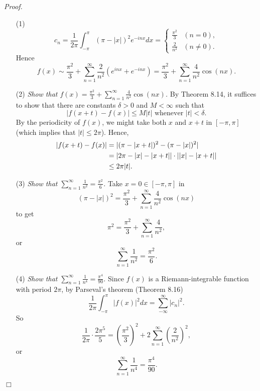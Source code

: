 \documentclass{article}
\begin{document}
\emph{Proof.}
\begin{enumerate}
\item[(1)]
\begin{equation*}
  c_n = \frac{1}{2 \pi} \int_{-\pi}^{\pi} (\pi - |x|)^2 e^{-inx} dx =
    \begin{cases}
      \frac{\pi^2}{3} & (n = 0), \\
      \frac{2}{n^2} & (n \neq 0).
    \end{cases}
\end{equation*}
Hence
\[
  f(x)
  \sim
  \frac{\pi^2}{3} + \sum_{n=1}^{\infty} \frac{2}{n^2}(e^{inx} + e^{-inx})
  =
  \frac{\pi^2}{3} + \sum_{n=1}^{\infty} \frac{4}{n^2} \cos(nx).
\]

\item[(2)]
\emph{Show that $f(x) = \frac{\pi^2}{3} + \sum_{n=1}^{\infty} \frac{4}{n^2} \cos(nx)$.}
By Theorem 8.14,
it suffices to show that there are constants $\delta > 0$ and $M < \infty$ such that
\[
  |f(x+t) - f(x)| \leq M|t| \text{ whenever } |t| < \delta.
\]
By the periodicity of $f(x)$, we might take both $x$ and $x+t$ in $[-\pi,\pi]$
(which implies that $|t| \leq 2\pi$).
Hence,
\begin{align*}
  |f(x+t) - f(x)|
  &= |(\pi-|x+t|)^2 - (\pi-|x|)^2| \\
  &= \abs{ 2\pi-|x|-|x+t| } \cdot \abs{ |x|-|x+t| } \\
  &\leq 2\pi |t|.
\end{align*}

\item[(3)]
\emph{Show that $\sum_{n=1}^{\infty} \frac{1}{n^2} = \frac{\pi^2}{6}$.}
Take $x = 0 \in [-\pi,\pi]$ in
\[
  (\pi-|x|)^2 = \frac{\pi^2}{3} + \sum_{n=1}^{\infty} \frac{4}{n^2} \cos(nx)
\]
to get
\[
  \pi^2 = \frac{\pi^2}{3} + \sum_{n=1}^{\infty} \frac{4}{n^2},
\]
or
\[
  \sum_{n=1}^{\infty} \frac{1}{n^2} = \frac{\pi^2}{6}.
\]

\item[(4)]
\emph{Show that $\sum_{n=1}^{\infty} \frac{1}{n^4} = \frac{\pi^4}{90}$.}
Since $f(x)$ is a Riemann-integrable function with period $2 \pi$,
by Parseval's theorem (Theorem 8.16)
\[
  \frac{1}{2 \pi} \int_{-\pi}^\pi |f(x)|^2 dx = \sum_{-\infty}^{\infty} |c_n|^2.
\]
So
\[
  \frac{1}{2\pi} \cdot \frac{2\pi^5}{5}
  = \left( \frac{\pi^2}{3} \right)^2
    + 2 \sum_{n=1}^{\infty} \left( \frac{2}{n^2} \right)^2,
\]
or
\[
  \sum_{n=1}^{\infty} \frac{1}{n^4} = \frac{\pi^4}{90}.
\]
\end{enumerate}
$\Box$ \\\\
\end{document}
